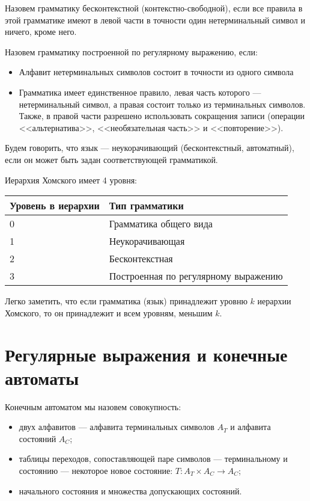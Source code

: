 \documentclass[12pt,a4paper,oneside]{article}
\begin{document}
\begin{definition}
Назовем грамматику бесконтекстной (контекстно-свободной), если все правила в этой
грамматике имеют в левой части в точности один нетерминальный символ и ничего, кроме
него.
\end{definition}

\begin{definition}
Назовем грамматику построенной по регулярному выражению, если:
\begin{itemize}
\item Алфавит нетерминальных символов состоит в точности из одного символа
\item Грамматика имеет единственное правило, левая часть которого --- нетерминальный
символ, а правая состоит только из терминальных символов. Также, в правой части
разрешено использовать сокращения записи (операции <<альтернатива>>, 
<<необязательная часть>> и <<повторение>>).
\end{itemize}
\end{definition}

\begin{definition}
Будем говорить, что язык --- неукорачивающий (бесконтекстный, автоматный), если
он может быть задан соответствующей грамматикой. 
\end{definition}

\begin{definition}Иерархия Хомского имеет 4 уровня:

\vspace{0.3cm}

\begin{tabular}{ll}
Уровень в иерархии&Тип грамматики\\
\hline
0 & Грамматика общего вида\\
1 & Неукорачивающая\\
2 & Бесконтекстная\\
3 & Построенная по регулярному выражению
\end{tabular}
\end{definition}

Легко заметить, что если грамматика (язык) принадлежит уровню $k$ иерархии Хомского, 
то он принадлежит и всем уровням, меньшим $k$.

\section{Регулярные выражения и конечные автоматы}

\begin{definition}
Конечным автоматом мы назовем совокупность:
\begin{itemize}                                         
\item двух алфавитов --- алфавита терминальных символов $A_T$ и алфавита состояний $A_C$;
\item таблицы переходов, сопоставляющей паре символов --- терминальному и состоянию --- некоторое
новое состояние: $T: A_T\times A_C \rightarrow A_C$;
\item начального состояния и множества допускающих состояний.
\end{itemize}
\end{definition}
\end{document}

